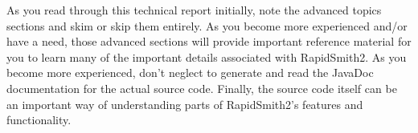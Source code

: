 As you read through this technical report initially, note the advanced topics
sections and skim or skip them entirely.  As you become more experienced and/or
have a need, those advanced sections will provide important reference material
for you to learn many of the important details associated with RapidSmith2.  As you
become more experienced, don't neglect to generate and read the JavaDoc
documentation for the actual source code.  Finally, the source code itself can
be an important way of understanding parts of  RapidSmith2's features and
functionality.
